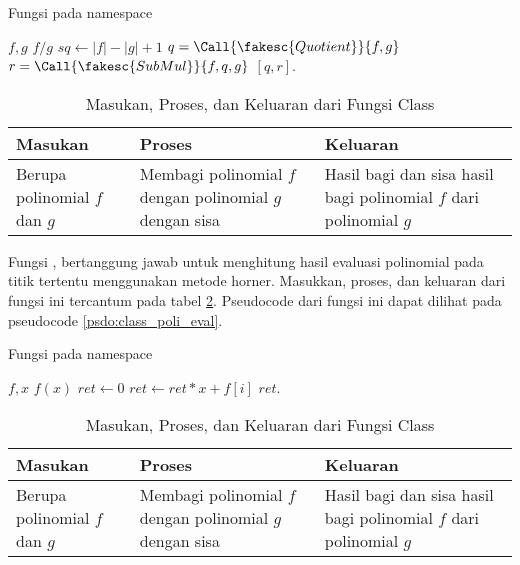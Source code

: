 \begin{algorithm}
	\caption{Fungsi  pada namespace }
	\label{psdo:class_poli_divrem}
	\begin{algorithmic}[1]
		\Require $ f, g $
		\Ensure $ f / g $
			\State \Return [$Poly(0), f$]
		\EndIf
			\State \Return {}
		\EndIf
		\State $ sq \leftarrow |f| - |g| + 1 $
		\State $ q = \Call{\fakesc{Quotient}}{f, g}$
		\State $ r = \Call{\fakesc{SubMul}}{f, q, g}$
		\State \Return $ [q, r] $.
	\end{algorithmic}
\end{algorithm}

\begin{table}[]	
	\Centering
	\begin{tabular}{|p{3cm}|p{3cm}|p{3cm}|}
	\hline
	Masukan & Proses & Keluaran \\ \hline
	Berupa polinomial $f$ dan $g$ & Membagi polinomial $f$ dengan polinomial $g$ dengan sisa  & Hasil bagi dan sisa hasil bagi polinomial $f$ dari polinomial $g$\\ \hline
	\end{tabular}
	\caption{Masukan, Proses, dan Keluaran dari Fungsi  Class }
	\label{tab:class_poli_divrem}
\end{table}

\newpage

Fungsi , bertanggung jawab untuk menghitung hasil evaluasi polinomial pada titik tertentu menggunakan metode horner. Masukkan, proses, dan keluaran dari fungsi ini tercantum pada tabel \ref{tab:class_poli_eval}. Pseudocode dari fungsi ini dapat dilihat pada pseudocode \ref{psdo:class_poli_eval}.

\begin{algorithm}
	\caption{Fungsi  pada namespace }
	\label{psdo:class_poli_eval}
	\begin{algorithmic}[1]
		\Require $ f, x $
		\Ensure $ f(x) $
		\State $ ret \leftarrow 0 $
			\State $ ret \leftarrow ret * x + f[i] $
		\EndFor
		\State \Return $ ret $.
	\end{algorithmic}
\end{algorithm}

\begin{table}[]	
	\Centering
	\begin{tabular}{|p{3cm}|p{3cm}|p{3cm}|}
	\hline
	Masukan & Proses & Keluaran \\ \hline
	Berupa polinomial $f$ dan $g$ & Membagi polinomial $f$ dengan polinomial $g$ dengan sisa  & Hasil bagi dan sisa hasil bagi polinomial $f$ dari polinomial $g$\\ \hline
	\end{tabular}
	\caption{Masukan, Proses, dan Keluaran dari Fungsi  Class }
	\label{tab:class_poli_eval}
\end{table}

